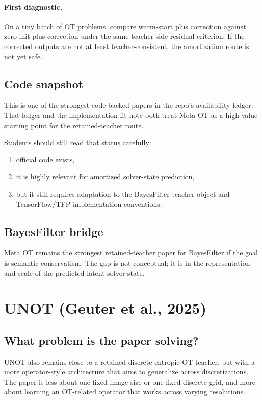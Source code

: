 \documentclass[11pt]{report}
\begin{document}
\paragraph{First diagnostic.}
On a tiny batch of OT problems, compare warm-start plus correction against zero-init plus
correction under the same teacher-side residual criterion.  If the corrected outputs are
not at least teacher-consistent, the amortization route is not yet safe.

\subsection*{Code snapshot}

This is one of the strongest code-backed papers in the repo's availability ledger.
That ledger and the implementation-fit note both treat Meta OT as a high-value
starting point for the retained-teacher route.

Students should still read that status carefully:
\begin{enumerate}[label=(\roman*)]
  \item official code exists,
  \item it is highly relevant for amortized solver-state prediction,
  \item but it still requires adaptation to the BayesFilter teacher object and TensorFlow/TFP implementation conventions.
\end{enumerate}

\subsection*{BayesFilter bridge}

Meta OT remains the strongest retained-teacher paper for BayesFilter if the goal is
semantic conservatism.  The gap is not conceptual; it is in the representation and
scale of the predicted latent solver state.

\section{UNOT (Geuter et al., 2025)}

\subsection*{What problem is the paper solving?}

UNOT also remains close to a retained discrete entropic OT teacher, but with a
more operator-style architecture that aims to generalize across discretizations.
The paper is less about one fixed image size or one fixed discrete grid, and more
about learning an OT-related operator that works across varying resolutions.
\end{document}
